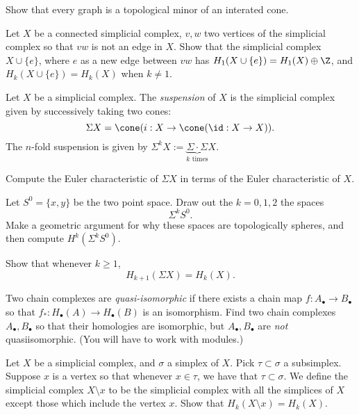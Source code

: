 \begin{exercise}\label{exer:hom:graphiterated}
 Show that every graph is a topological minor of an interated cone. 
\end{exercise}

\begin{exercise}\label{exer:hom:coneedge}
Let $X$ be a connected simplicial complex, $v, w$ two vertices of the simplicial complex so that $vw$ is not an edge in $X$. Show that the simplicial complex $X\cup \{e\}$, where $e$ as a new edge between $vw$ has $H_1(X\cup\{e\})=H_1(X)\oplus \Z$, and $H_k(X\cup\{e\})=H_k(X)$ when $k\neq 1$. 
\end{exercise}

Let $X$ be a simplicial complex. The \emph{suspension} of $X$ is the simplicial complex given by successively taking two cones:
\[\Sigma X=\cone(i:X\to \cone(\id:X\to X)).\]
The $n$-fold suspension is given by $\Sigma^kX:=\underbrace{\Sigma\cdot \Sigma}_{k \text{ times}} X$. 
\begin{exercise}\label{exer:hom:suspensioneuler}
Compute the Euler characteristic of $\Sigma X$ in terms of the Euler characteristic of $X$. 
\end{exercise}

\begin{exercise}\label{exer:hom:suspension}
Let $S^0=\{x, y\}$ be the two point space. Draw out the  $k=0, 1, 2$ the spaces
\[\Sigma^k S^0.\]
Make a geometric argument for why these spaces are topologically spheres, and then compute $H^k(\Sigma^k S^0).$ 
\end{exercise}

\begin{exercise}\label{exer:hom:suspensionhomology}
Show that whenever $k\geq 1$, 
\[H_{k+1}(\Sigma X ) = H_k(X). \]
\end{exercise}






\begin{exercise}
Two chain complexes are \emph{quasi-isomorphic} if there exists a chain map $f: A_\bullet\to B_\bullet$ so that $f_*: H_\bullet(A)\to H_\bullet(B)$ is an isomorphism. Find two chain complexes $A_\bullet, B_\bullet$ so that their homologies are isomorphic, but $A_\bullet, B_\bullet$ are \emph{not} quasiisomorphic. (You will have to work with modules.)
\end{exercise}

\begin{exercise}
Let $X$ be a simplicial complex, and $\sigma$ a simplex of $X$. Pick $\tau \subset \sigma$ a subsimplex. Suppose $x$ is a vertex so that whenever $x\in \tau$, we have that $\tau\subset \sigma$.  We define the simplicial complex $X\setminus x$ to be the simplicial complex with all the simplices of $X$ except those which include the vertex $x$. Show that $H_k(X\setminus x)=H_k(X)$. 
\end{exercise}

